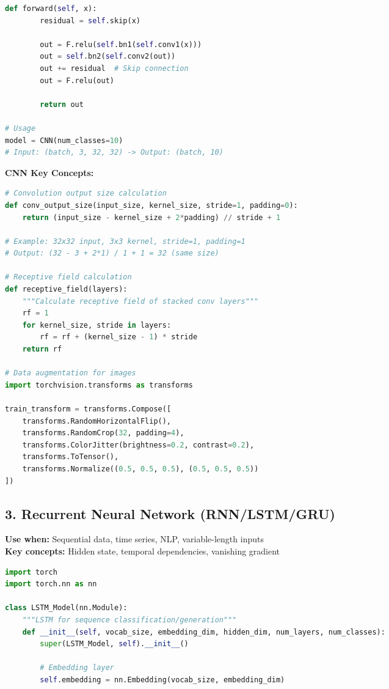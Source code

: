 \documentclass[8pt,landscape]{article}
\begin{document}
\begin{multicols}{3}
\begin{lstlisting}[language=Python]
    def forward(self, x):
        residual = self.skip(x)

        out = F.relu(self.bn1(self.conv1(x)))
        out = self.bn2(self.conv2(out))
        out += residual  # Skip connection
        out = F.relu(out)

        return out

# Usage
model = CNN(num_classes=10)
# Input: (batch, 3, 32, 32) -> Output: (batch, 10)
\end{lstlisting}

\textbf{CNN Key Concepts:}
\begin{lstlisting}[language=Python]
# Convolution output size calculation
def conv_output_size(input_size, kernel_size, stride=1, padding=0):
    return (input_size - kernel_size + 2*padding) // stride + 1

# Example: 32x32 input, 3x3 kernel, stride=1, padding=1
# Output: (32 - 3 + 2*1) / 1 + 1 = 32 (same size)

# Receptive field calculation
def receptive_field(layers):
    """Calculate receptive field of stacked conv layers"""
    rf = 1
    for kernel_size, stride in layers:
        rf = rf + (kernel_size - 1) * stride
    return rf

# Data augmentation for images
import torchvision.transforms as transforms

train_transform = transforms.Compose([
    transforms.RandomHorizontalFlip(),
    transforms.RandomCrop(32, padding=4),
    transforms.ColorJitter(brightness=0.2, contrast=0.2),
    transforms.ToTensor(),
    transforms.Normalize((0.5, 0.5, 0.5), (0.5, 0.5, 0.5))
])
\end{lstlisting}

\subsection*{3. Recurrent Neural Network (RNN/LSTM/GRU)}
\textbf{Use when:} Sequential data, time series, NLP, variable-length inputs \\
\textbf{Key concepts:} Hidden state, temporal dependencies, vanishing gradient
\begin{lstlisting}[language=Python]
import torch
import torch.nn as nn

class LSTM_Model(nn.Module):
    """LSTM for sequence classification/generation"""
    def __init__(self, vocab_size, embedding_dim, hidden_dim, num_layers, num_classes):
        super(LSTM_Model, self).__init__()

        # Embedding layer
        self.embedding = nn.Embedding(vocab_size, embedding_dim)


\end{lstlisting}
\end{multicols}
\end{document}
